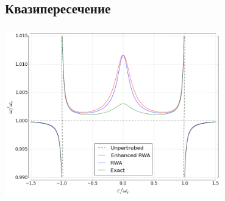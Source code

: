 \documentclass[aspectratio=169, 13pt]{beamer}
\begin{document}
\subsection{Квазипересечение}
\begin{frame}[c]\frametitle{\secname}\framesubtitle{\subsecname}
\centering
\includegraphics[width=0.7\textwidth]{Rabi_anticrossing}
\end{frame}
\end{document}
